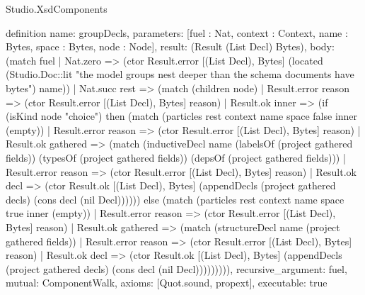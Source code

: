 \begin{lexlean}{Studio.XsdComponents}
\begin{semanticmodule}
definition{
  name: groupDecls,
  parameters: [fuel : Nat, context : Context, name : Bytes, space : Bytes, node : Node],
  result: (Result (List Decl) Bytes),
  body: (match fuel
    | Nat.zero => (ctor Result.error [(List Decl), Bytes] (located (Studio.Doc::lit "the model groups nest deeper than the schema documents have bytes") name))
    | Nat.succ rest => (match (children node)
      | Result.error reason => (ctor Result.error [(List Decl), Bytes] reason)
      | Result.ok inner => (if (isKind node "choice") then (match (particles rest context name space false inner (empty))
        | Result.error reason => (ctor Result.error [(List Decl), Bytes] reason)
        | Result.ok gathered => (match (inductiveDecl name (labelsOf (project gathered fields)) (typesOf (project gathered fields)) (depsOf (project gathered fields)))
          | Result.error reason => (ctor Result.error [(List Decl), Bytes] reason)
          | Result.ok decl => (ctor Result.ok [(List Decl), Bytes] (appendDecls (project gathered decls) (cons decl (nil Decl)))))) else (match (particles rest context name space true inner (empty))
        | Result.error reason => (ctor Result.error [(List Decl), Bytes] reason)
        | Result.ok gathered => (match (structureDecl name (project gathered fields))
          | Result.error reason => (ctor Result.error [(List Decl), Bytes] reason)
          | Result.ok decl => (ctor Result.ok [(List Decl), Bytes] (appendDecls (project gathered decls) (cons decl (nil Decl))))))))),
  recursive_argument: fuel,
  mutual: ComponentWalk,
  axioms: [Quot.sound, propext],
  executable: true
}


\end{semanticmodule}
\end{lexlean}
